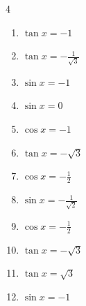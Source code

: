\begin{multicols}{4}
\begin{enumerate}
\columnbreak %

  \item $\displaystyle \tan{x}  = -1$


  \item $\displaystyle \tan{x}  = -\frac{1}{\sqrt{3}}$


  \item $\displaystyle \sin{x}  = -1$


  \item $\displaystyle \sin{x}  = 0$

        \phantom{$\displaystyle x = 0 , \pi$}

  \item $\displaystyle \cos{x}  = -1$

        \phantom{$\displaystyle x = \pi$}

  \item $\displaystyle \tan{x}  = -\sqrt{3}$


  \item $\displaystyle \cos{x}  = -\frac{1}{2}$


  \item $\displaystyle \sin{x}  = -\frac{1}{\sqrt{2}}$


  \item $\displaystyle \cos{x}  = -\frac{1}{2}$


  \item $\displaystyle \tan{x}  = -\sqrt{3}$


  \item $\displaystyle \tan{x}  = \sqrt{3}$


  \item $\displaystyle \sin{x}  = -1$


\end{enumerate}
\end{multicols}
